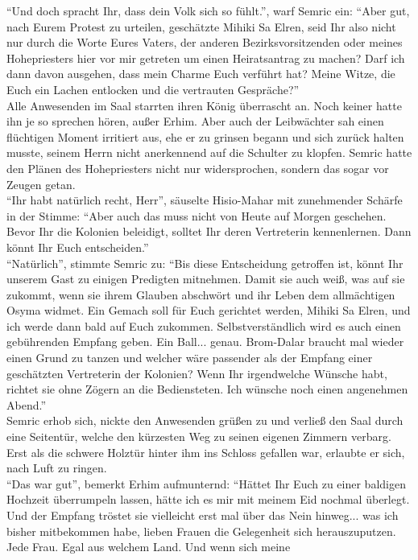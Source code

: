 ``Und doch spracht Ihr, dass dein Volk sich so fühlt.'', warf Semric ein: ``Aber gut, nach Eurem 
Protest zu urteilen, geschätzte Mihiki Sa Elren, seid Ihr also nicht nur durch die Worte Eures 
Vaters, der anderen Bezirksvorsitzenden oder meines Hohepriesters hier vor mir getreten um einen 
Heiratsantrag zu machen? Darf ich dann davon ausgehen, dass mein Charme Euch verführt hat? Meine 
Witze, die Euch ein Lachen entlocken und die vertrauten Gespräche?''\\
Alle Anwesenden im Saal starrten ihren König überrascht an. Noch keiner hatte ihn je so sprechen 
hören, außer Erhim. Aber auch der Leibwächter sah einen flüchtigen Moment irritiert aus, ehe er zu 
grinsen begann und sich zurück halten musste, seinem Herrn nicht anerkennend auf die Schulter zu 
klopfen. Semric hatte den Plänen des Hohepriesters nicht nur widersprochen, sondern das sogar vor 
Zeugen getan.\\
``Ihr habt natürlich recht, Herr'', säuselte Hisio-Mahar mit zunehmender Schärfe in der Stimme: 
``Aber auch das muss nicht von Heute auf Morgen geschehen. Bevor Ihr die Kolonien beleidigt, 
solltet Ihr deren Vertreterin kennenlernen. Dann könnt Ihr Euch entscheiden.''\\
``Natürlich'', stimmte Semric zu: ``Bis diese Entscheidung getroffen ist, könnt Ihr unserem Gast zu 
einigen Predigten mitnehmen. Damit sie auch weiß, was auf sie zukommt, wenn sie ihrem Glauben 
abschwört und ihr Leben dem allmächtigen Osyma widmet. Ein Gemach soll für Euch gerichtet werden, 
Mihiki Sa Elren, und ich werde dann bald auf Euch zukommen. Selbstverständlich wird es auch einen 
gebührenden Empfang geben. Ein Ball... genau. Brom-Dalar braucht mal wieder einen Grund zu tanzen 
und welcher wäre passender als der Empfang einer geschätzten Vertreterin der Kolonien? Wenn Ihr 
irgendwelche Wünsche habt, richtet sie ohne Zögern an die Bediensteten. Ich wünsche noch einen 
angenehmen Abend.''\\
Semric erhob sich, nickte den Anwesenden grüßen zu und verließ den Saal durch eine Seitentür, 
welche den kürzesten Weg zu seinen eigenen Zimmern verbarg. Erst als die schwere Holztür hinter ihm 
ins Schloss gefallen war, erlaubte er sich, nach Luft zu ringen.\\
``Das war gut'', bemerkt Erhim aufmunternd: ``Hättet Ihr Euch zu einer baldigen Hochzeit 
überrumpeln lassen, hätte ich es mir mit meinem Eid nochmal überlegt. Und der Empfang tröstet 
sie vielleicht erst mal über das Nein hinweg... was ich bisher mitbekommen habe, lieben Frauen 
die Gelegenheit sich herauszuputzen. Jede Frau. Egal aus welchem Land. Und wenn sich meine 
